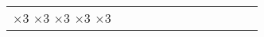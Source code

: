 \documentclass[runningheads]{llncs}
\begin{document}
\begin{table}[!ht]
\begin{tabular}{|p{7em}|p{2.5em}|p{2.5em}|p{3em}|p{2.5em}|p{3em}|p{2.5em}|p{3em}|p{2.5em}|p{3em}|p{2.5em}|p{3em}|}
		$\times3$ \newline{}$\times3$ \newline{}$\times3$ \newline{}$\times3$ \newline{}$\times3$ \newline{}
\end{tabular}
\end{table}
\end{document}
